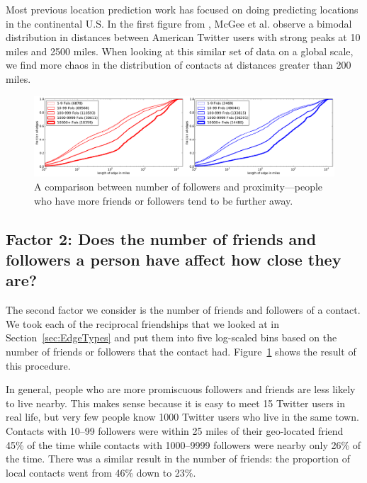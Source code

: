 \documentclass{sig-alternate}
\begin{document}
Most previous location prediction work has focused on doing predicting
locations in the continental U.S.
%
In the first figure from \cite{mcgee2011geographic}, McGee et al. observe a
bimodal distribution in distances between American Twitter users with strong
peaks at 10 miles and 2500 miles.
%
When looking at this similar set of data on a global scale, we find more chaos
in the distribution of contacts at distances greater than 200 miles.

\begin{figure}[tb]
\centering
\includegraphics[width=\linewidth]{figures/edge_counts.pdf}
\caption{
A comparison between number of followers and proximity---people who have more
friends or followers tend to be further away.
}
\label{fig:EdgeCounts}
\vspace{-2pt}
\end{figure}

\subsection{Factor 2: Does the number of friends and followers a person have affect how
close they are?}

The second factor we consider is the number of friends and followers of a contact.
%
%
%
We took each of the reciprocal friendships that we looked at in
Section~\ref{sec:EdgeTypes} and put them into five log-scaled bins based on
the number of friends or followers that the contact had.
%
Figure~\ref{fig:EdgeCounts} shows the result of this procedure.

In general, people who are more promiscuous followers and friends are less
likely to live nearby.
%
This makes sense because it is easy to meet 15 Twitter users in real life, but
very few people know 1000 Twitter users who live in the same town.
%
Contacts with 10--99 followers were within 25 miles of their geo-located friend
45\% of the time while contacts with 1000--9999 followers were nearby only 26\%
of the time.
%
There was a similar result in the number of friends: the proportion of local
contacts went from 46\% down to 23\%.
\end{document}
